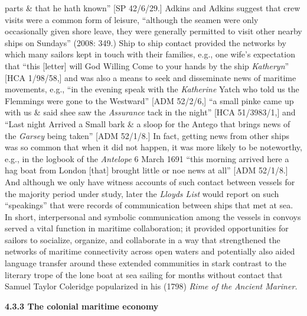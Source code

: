\documentclass[12pt]{article}
\newenvironment{styleStandard}{\renewcommand\baselinestretch{1.0}\setlength\leftskip{0cm}\setlength\rightskip{0cm plus 1fil}\setlength\parindent{0cm}\setlength\parfillskip{0pt plus 1fil}\setlength\parskip{0in plus 1pt}\writerlistparindent\writerlistleftskip\leavevmode\normalfont\normalsize\writerlistlabel\ignorespaces}{\unskip\vspace{0in plus 1pt}\par}
\newcommand\writerlistleftskip{}
\newcommand\writerlistparindent{}
\newcommand\writerlistlabel{}
\begin{document}
\begin{styleStandard}
parts \& that he hath known” [SP 42/6/29.] Adkins and Adkins suggest that crew visits were a common form of leisure, “although the seamen were only occasionally given shore leave, they were generally permitted to visit other nearby ships on Sundays” (2008: 349.) Ship to ship contact provided the networks by which many sailors kept in touch with their families, e.g., one wife’s expectation that “this [letter] will God Willing Come to your hands by the ship\textit{ Katheryn}” [HCA 1/98/58,] and was also a means to seek and disseminate news of maritime movements, e.g., “in the evening speak with the \textit{Katherine }Yatch who told us the Flemmings were gone to the Westward” [ADM 52/2/6,] “a small pinke came up with us \& said shee saw the \textit{Assurance} tack in the night” [HCA 51/3983/1,] and “Last night Arrived a Small bark \& a sloop for the Antego that brings news of the \textit{Garsey }being taken” [ADM 52/1/8.] In fact, getting news from other ships was so common that when it did\textit{ }not happen, it was more likely to be noteworthy, e.g., in the logbook of the\textit{ Antelope} 6 March 1691 “this morning arrived here a hag boat from London [that] brought little or noe news at all” [ADM 52/1/8.] And although we only have witness accounts of such contact between vessels for the majority period under study, later the \textit{Lloyd{\textquotesingle}s List} would report on such “speakings” that were records of communication between ships that met at sea. In short, interpersonal and symbolic communication among the vessels in convoys served a vital function in maritime collaboration; it provided opportunities for sailors to socialize, organize, and collaborate in a way that strengthened the networks of maritime connectivity across open waters and potentially also aided language transfer around these extended communities in stark contrast to the literary trope of the lone boat at sea sailing for months without contact that Samuel Taylor Coleridge popularized in his (1798) \textit{Rime of the }\textit{\MakeUppercase{A}}\textit{ncient Mariner. }
\end{styleStandard}


\begin{styleStandard}
\textbf{4.3.3 The colonial maritime economy}
\end{styleStandard}
\end{document}
